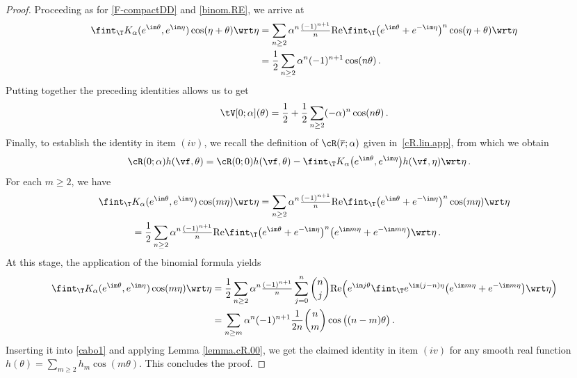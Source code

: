 \documentclass[a4paper,reqno,10pt]{article}
\begin{document}
\begin{proof}
        Proceeding as for \eqref{F-compactDD} and \eqref{binom.RE}, we arrive at
         \begin{align*}
\nonumber   \fint_{\T} K_\alpha (  e^{\im\theta},  e^{\im\eta} ) \cos(\eta+\theta)  \wrt \eta
        &=\sum_{n\geq 2} \alpha^{n}\tfrac{(-1)^{n+1}}{n} {\rm Re}\fint_{\T} \big( e^{\im\theta}+e^{-\im\eta} \big)^n \cos(\eta+\theta)  \wrt \eta\\
        &=\frac{1}{2}\sum_{n\geq 2} \alpha^{n}(-1)^{n+1}  \cos(n \theta)\,. 
\end{align*}
Putting together the preceding identities allows us to get
\begin{equation}
			\nonumber \tV[0;\alpha](\theta) = \frac12+\frac{1}{2}\sum_{n\geq 2} (-\alpha)^{n}  \cos(n \theta)\,.
		\end{equation}
Finally, to establish the identity in item $(iv)$, we recall the definition of $\cR(\overline{r};\alpha)$ given \mbox{in \eqref{cR.lin.app},} from which we obtain
\begin{align}\label{cabo1}
		\cR(0;\alpha) h(\vf,\theta)& = \cR(0;0) h(\vf,\theta)   -\fint_{\T} K_{\alpha}\big( e^{\im\theta}, e^{\im\eta} \big) h(\vf,\eta) \wrt \eta\,.
	\end{align}
    For each $m\geqslant 2$, we have
    \begin{align*}
\nonumber   \fint_{\T} & K_\alpha (  e^{\im\theta},  e^{\im\eta} ) \cos(m\eta)  \wrt \eta
        =\sum_{n\geq 2} \alpha^{n}\tfrac{(-1)^{n+1}}{n} {\rm Re}\fint_{\T} \big( e^{\im\theta}+e^{-\im\eta} \big)^n \cos(m\eta)  \wrt \eta\\
        &=\frac{1}{2}\sum_{n\geq 2} \alpha^{n}\tfrac{(-1)^{n+1}}{n} {\rm Re}\fint_{\T} \big( e^{\im\theta}+e^{-\im\eta} \big)^n \big(e^{\im m \eta}+e^{-\im m \eta}\big)  \wrt \eta\,. 
\end{align*}
At this stage, the application of the binomial formula yields
\begin{align*}
\nonumber   \fint_{\T}  K_\alpha (  e^{\im\theta},  e^{\im\eta} ) \cos(m\eta)  \wrt \eta
        & =\frac{1}{2}\sum_{n\geq 2} \alpha^{n}\tfrac{(-1)^{n+1}}{n} \sum_{j=0}^{n} \binom{n}{j} {\rm Re}\Big( e^{\im j\theta} \fint_{\T} e^{\im(j-n)\eta} \big(e^{\im m \eta}+e^{-\im m \eta}\big)  \wrt \eta \Big) \\
        &=\sum_{n\geq m} \alpha^{n}(-1)^{n+1}\frac{1}{2n} \binom{n}{m}  \cos\big((n-m) \theta\big)\,. 
\end{align*}
Inserting it into \eqref{cabo1} and applying Lemma \ref{lemma.cR.00}, we get the claimed identity in item $(iv)$ for any smooth real function $h(\theta)=\sum_{m\geqslant2}h_m \cos(m\theta)$. This concludes the proof.
\end{proof}
\end{document}
